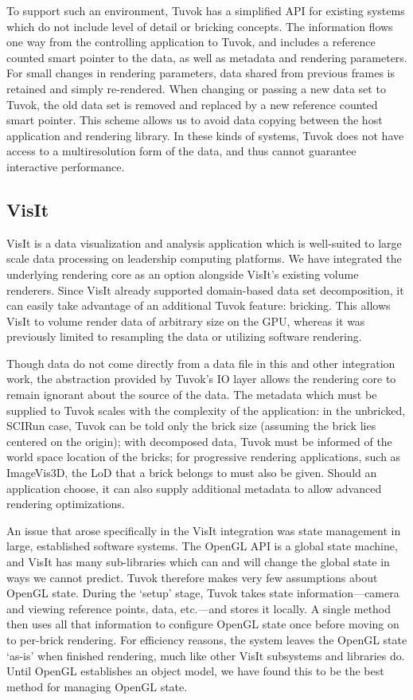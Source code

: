 To support such an environment, Tuvok has a simplified
API for existing systems which do not include level of detail
or bricking concepts. The information flows one way from
the controlling application to Tuvok, and includes a reference
counted smart pointer to the data, as well as metadata
and rendering parameters. For small changes in rendering
parameters, data shared from previous frames is retained and
simply re-rendered. When changing or passing a new data
set to Tuvok, the old data set is removed and replaced by
a new reference counted smart pointer. This scheme allows
us to avoid data copying between the host application and
rendering library. In these kinds of systems, Tuvok does not
have access to a multiresolution form of the data, and thus
cannot guarantee interactive performance.

\subsection{VisIt}

VisIt is a data visualization and analysis application which is
well-suited to large scale data processing on leadership computing
platforms. We have integrated the underlying rendering
core as an option alongside VisIt's existing volume renderers.
Since VisIt already supported domain-based data set
decomposition, it can easily take advantage of an additional
Tuvok feature: bricking. This allows VisIt to volume render
data of arbitrary size on the GPU, whereas it was previously
limited to resampling the data or utilizing software rendering.

Though data do not come directly from a data file in this
and other integration work, the abstraction provided by Tuvok's
IO layer allows the rendering core to remain ignorant
about the source of the data. The metadata which must be
supplied to Tuvok scales with the complexity of the application:
in the unbricked, SCIRun case, Tuvok can be told only
the brick size (assuming the brick lies centered on the origin);
with decomposed data, Tuvok must be informed of the
world space location of the bricks; for progressive rendering
applications, such as ImageVis3D, the LoD that a brick belongs
to must also be given. Should an application choose, it
can also supply additional metadata to allow advanced rendering
optimizations.

An issue that arose specifically in the VisIt integration
was state management in large, established software systems.
The OpenGL API is a global state machine, and VisIt
has many sub-libraries which can and will change the global
state in ways we cannot predict. Tuvok therefore makes very
few assumptions about OpenGL state. During the `setup'
stage, Tuvok takes state information---camera and viewing
reference points, data, etc.---and stores it locally.
A single method then uses all that information to configure
OpenGL state once before moving on to per-brick rendering.
For efficiency reasons, the system leaves the OpenGL
state `as-is' when finished rendering, much like other VisIt
subsystems and libraries do. Until OpenGL establishes an
object model, we have found this to be the best method for
managing OpenGL state.

